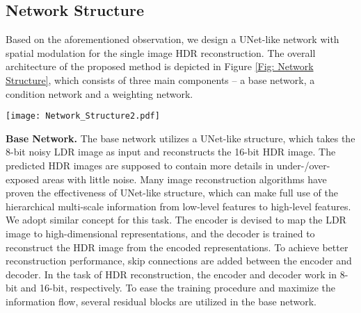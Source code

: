 \documentclass[final]{cvpr}
\begin{document}
\subsection{Network Structure}
Based on the aforementioned observation, we design a UNet-like network with spatial modulation for the single image HDR reconstruction. The overall architecture of the proposed method is depicted in Figure \ref{Fig: Network Structure}, which consists of three main components -- a base network, a condition network and a weighting network.

\begin{figure*}[!t]
    \begin{center}
    \texttt{[image: Network\_Structure2.pdf]}
\end{center}
    \vspace{-15pt}
    \caption{Network structure of our HDRUNet with a base network, a condition network and a weighting network. The three modules all take the LDR image as input. Particularly, the condition network predicts condition maps that afterwards utilized to modulate the intermediate features in the base network.}
    \label{Fig: Network Structure}
    \vspace{-10pt}
\end{figure*}

\textbf{Base Network.}
The base network utilizes a UNet-like structure, which takes the 8-bit noisy LDR image as input and reconstructs the 16-bit HDR image. The predicted HDR images are supposed to contain more details in under-/over-exposed areas with little noise. Many image reconstruction algorithms \cite{eilertsen2017hdr, liu2020single} have proven the effectiveness of UNet-like structure, which can make full use of the hierarchical multi-scale information from low-level features to high-level features. We adopt similar concept for this task. The encoder is devised to map the LDR image to high-dimensional representations, and the decoder is trained to reconstruct the HDR image from the encoded representations. To achieve better reconstruction performance, skip connections are added between the encoder and decoder. In the task of HDR reconstruction, the encoder and decoder work in 8-bit and 16-bit, respectively. To ease the training procedure and maximize the information flow, several residual blocks are utilized in the base network.
\end{document}
